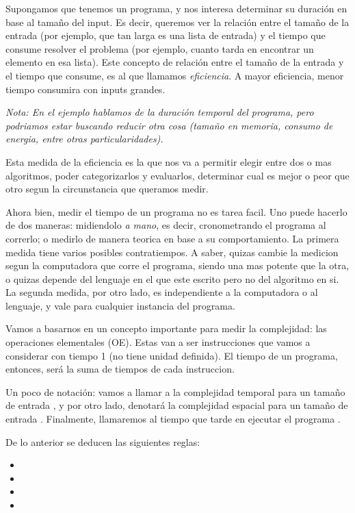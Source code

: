 \documentclass{article}
\begin{document}
Supongamos que tenemos un programa, y nos interesa determinar su duración en base al tamaño del input. Es decir, queremos ver la relación entre el tamaño de la entrada (por ejemplo, que tan larga es una lista de entrada) y el tiempo que consume resolver el problema (por ejemplo, cuanto tarda en encontrar un elemento en esa lista). Este concepto de relación entre el tamaño de la entrada y el tiempo que consume, es al que llamamos \textit{eficiencia}. A mayor eficiencia, menor tiempo consumira con inputs grandes.

\textit{Nota: En el ejemplo hablamos de la duración temporal del programa, pero podriamos estar buscando reducir otra cosa (tamaño en memoria, consumo de energia, entre otras particularidades).}

Esta medida de la eficiencia es la que nos va a permitir elegir entre dos o mas algoritmos, poder categorizarlos y evaluarlos, determinar cual es mejor o peor que otro segun la circunstancia que queramos medir.

Ahora bien, medir el tiempo de un programa no es tarea facil. Uno puede hacerlo de dos maneras: midiendolo \textit{a mano}, es decir, cronometrando el programa al correrlo; o medirlo de manera teorica en base a su comportamiento. La primera medida tiene varios posibles contratiempos. A saber, quizas cambie la medicion segun la computadora que corre el programa, siendo una mas potente que la otra, o quizas depende del lenguaje en el que este escrito pero no del algoritmo en si. La segunda medida, por otro lado, es independiente a la computadora o al lenguaje, y vale para cualquier instancia del programa.

Vamos a basarnos en un concepto importante para medir la complejidad: las operaciones elementales (OE). Estas van a ser instrucciones que vamos a considerar con tiempo 1 (no tiene unidad definida). El tiempo de un programa, entonces, será la suma de tiempos de cada instruccion.

Un poco de notación: vamos a llamar  a la complejidad temporal para un tamaño de entrada , y por otro lado,  denotará la complejidad espacial para un tamaño de entrada . Finalmente, llamaremos  al tiempo que tarde en ejecutar el programa .

De lo anterior se deducen las siguientes reglas:

\begin{itemize}
	\item {}
	\item {}
	\item {}
	\item {}
\end{itemize}
\end{document}
